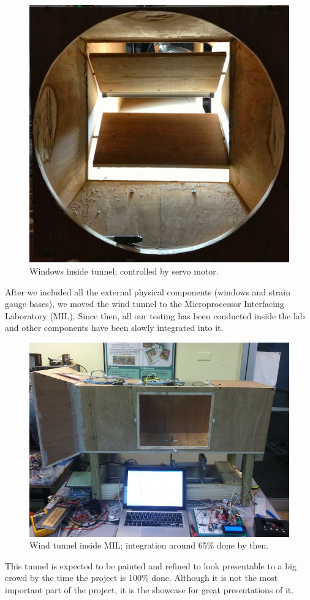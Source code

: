 		\begin{figure}[H]
			\centering
				\includegraphics[scale=0.45]{img/Windows}
			\caption{Windows inside tunnel; controlled by servo motor.}
		\end{figure}
		
		After we included all the external physical components (windows and strain gauge bases), we moved the wind tunnel to the Microprocessor Interfacing Laboratory (MIL). Since then, all our testing has been conducted inside the lab and other components have been slowly integrated into it.
		
		\begin{figure}[H]
			\centering
				\includegraphics[scale=0.35]{img/WindTunnelMIL}
			\caption{Wind tunnel inside MIL; integration around 65\% done by then.}
		\end{figure}
		
		This tunnel is expected to be painted and refined to look presentable to a big crowd by the time the project is 100\% done. Although it is not the most important part of the project, it is the showcase for great presentations of it.
		
		